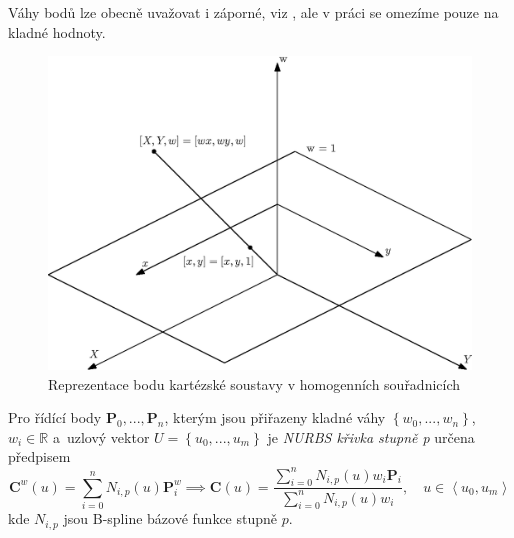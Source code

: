 \begin{poznamka}
	Váhy bodů lze obecně uvažovat i záporné, viz \cite{Pieglc1997}, ale v práci se omezíme pouze na kladné hodnoty.
\end{poznamka}

\begin{figure}[!h]
	\begin{center}
		\includegraphics*[]{obr/projekce}
	\end{center}
	\caption{Reprezentace bodu kartézské soustavy v homogenních souřadnicích}
	\label{obrProjekce}
\end{figure}


\begin{definice}
	Pro řídící body $\mathbf{P}_0,...,\mathbf{P}_n$, kterým jsou přiřazeny kladné váhy $\left\lbrace w_0,...,w_n \right\rbrace$, $w_i\in\mathbb{R}$ a~uzlový vektor $U=\left\lbrace u_0,...,u_m \right\rbrace$ je \emph{NURBS křivka stupně p} určena předpisem
	\begin{equation}\label{nurbs}
		\mathbf{C}^w\left(u\right)=\sum _{i=0}^{n}{N}_{i,p}\left(u\right)\mathbf{P}^w_i \implies \mathbf{C}\left(u\right)=\frac{\sum _{i=0}^{n}{N}_{i,p}\left(u\right)w_i\mathbf{P}_i}{\sum _{i=0}^{n}{N}_{i,p}\left(u\right)w_i},\quad u \in \left\langle u_0,u_m \right\rangle 
	\end{equation}
	kde ${N}_{i,p}$ jsou B-spline bázové funkce stupně $p$.
\end{definice}

